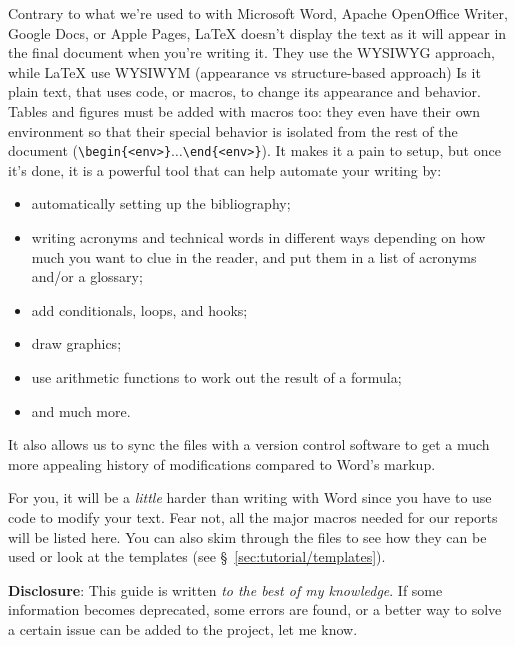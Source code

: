 Contrary to what we're used to with Microsoft Word, Apache OpenOffice Writer, Google Docs, or Apple Pages, \LaTeX{} doesn't display the text as it will appear in the final document when you're writing it. They use the \gls{WYSIWYG} approach, while \LaTeX{} use \gls{WYSIWYM} (appearance vs structure-based approach) Is it plain text, that uses code, or \glspl{macro}, to change its appearance and behavior. Tables and figures must be added with \glspl{macro} too: they even have their own \gls{environment} so that their special behavior is isolated from the rest of the document (\texttt{\textbackslash{}begin\{<env>\}}$\ldots$\texttt{\textbackslash{}end\{<env>\}}). It makes it a pain to setup, but once it's done, it is a powerful tool that can help automate your writing by:
\begin{itemize}
    \item automatically setting up the bibliography;
    \item writing acronyms and technical words in different ways depending on how much you want to clue in the reader, and put them in a list of acronyms and/or a glossary;
    \item add \glspl{conditional}, \glspl{loop}, and \glspl{hook};
    \item draw graphics;
    \item use arithmetic functions to work out the result of a formula;
    \item and much more.
\end{itemize}
It also allows us to sync the files with a version control software to get a much more appealing history of modifications compared to Word's markup.

For you, it will be a \textit{little} harder than writing with Word since you have to use code to modify your text. Fear not, all the major \glspl{macro} needed for our reports will be listed here. You can also skim through the files to see how they can be used or look at the templates (see \S~\ref{sec:tutorial/templates}).

\textbf{Disclosure}: This guide is written \textit{to the best of my knowledge}. If some information becomes deprecated, some errors are found, or a better way to solve a certain issue can be added to the project, let me know.